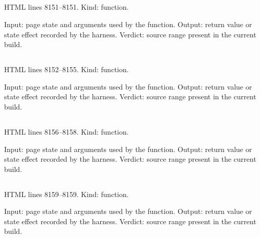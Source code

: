 \subsection*{\texttt{}}
\label{vf_437_sourceSHA256Of}
HTML lines 8151--8151. Kind: function.

Input: page state and arguments used by the function.
Output: return value or state effect recorded by the harness.
Verdict: source range present in the current build.

\subsection*{\texttt{}}
\label{vf_438_runDurationMinutes}
HTML lines 8152--8155. Kind: function.

Input: page state and arguments used by the function.
Output: return value or state effect recorded by the harness.
Verdict: source range present in the current build.

\subsection*{\texttt{}}
\label{vf_439_uniqueCurveCount}
HTML lines 8156--8158. Kind: function.

Input: page state and arguments used by the function.
Output: return value or state effect recorded by the harness.
Verdict: source range present in the current build.

\subsection*{\texttt{}}
\label{vf_440_acquiredCurveCount}
HTML lines 8159--8159. Kind: function.

Input: page state and arguments used by the function.
Output: return value or state effect recorded by the harness.
Verdict: source range present in the current build.

